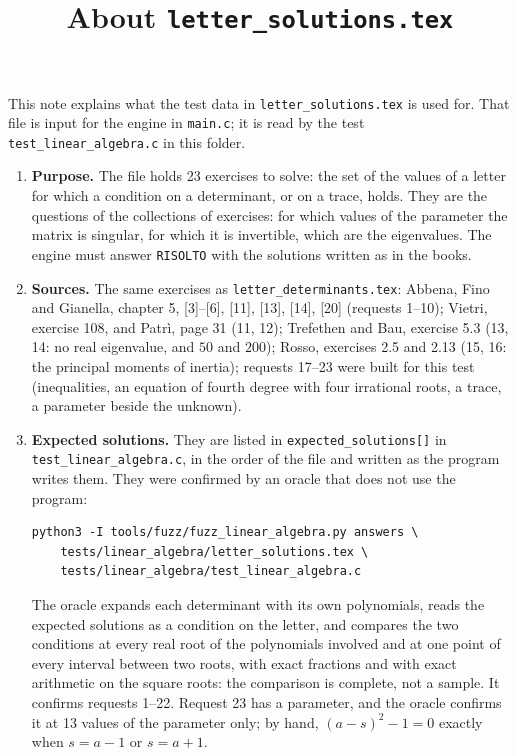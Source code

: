\documentclass[11pt,a4paper]{article}
\title{About \texttt{letter\_solutions.tex}}
\author{}
\date{}
\begin{document}
\maketitle
This note explains what the test data in \texttt{letter\_solutions.tex} is used for. That file is input for the engine in \texttt{main.c}; it is read by the test \texttt{test\_linear\_algebra.c} in this folder.

\begin{enumerate}
\item \textbf{Purpose.} The file holds 23 exercises to solve: the set of the values of a letter for which a condition on a determinant, or on a trace, holds. They are the questions of the collections of exercises: for which values of the parameter the matrix is singular, for which it is invertible, which are the eigenvalues. The engine must answer \texttt{RISOLTO} with the solutions written as in the books.

\item \textbf{Sources.} The same exercises as \texttt{letter\_determinants.tex}: Abbena, Fino and Gianella, chapter 5, [3]--[6], [11], [13], [14], [20] (requests 1--10); Vietri, exercise 108, and Patr\`i, page 31 (11, 12); Trefethen and Bau, exercise 5.3 (13, 14: no real eigenvalue, and $50$ and $200$); Rosso, exercises 2.5 and 2.13 (15, 16: the principal moments of inertia); requests 17--23 were built for this test (inequalities, an equation of fourth degree with four irrational roots, a trace, a parameter beside the unknown).

\item \textbf{Expected solutions.} They are listed in \texttt{expected\_solutions[]} in \texttt{test\_linear\_algebra.c}, in the order of the file and written as the program writes them. They were confirmed by an oracle that does not use the program:
\begin{verbatim}
python3 -I tools/fuzz/fuzz_linear_algebra.py answers \
    tests/linear_algebra/letter_solutions.tex \
    tests/linear_algebra/test_linear_algebra.c
\end{verbatim}
The oracle expands each determinant with its own polynomials, reads the expected solutions as a condition on the letter, and compares the two conditions at every real root of the polynomials involved and at one point of every interval between two roots, with exact fractions and with exact arithmetic on the square roots: the comparison is complete, not a sample. It confirms requests 1--22. Request 23 has a parameter, and the oracle confirms it at 13 values of the parameter only; by hand, $(a - s)^{2} - 1 = 0$ exactly when $s = a - 1$ or $s = a + 1$.


\end{enumerate}
\end{document}
